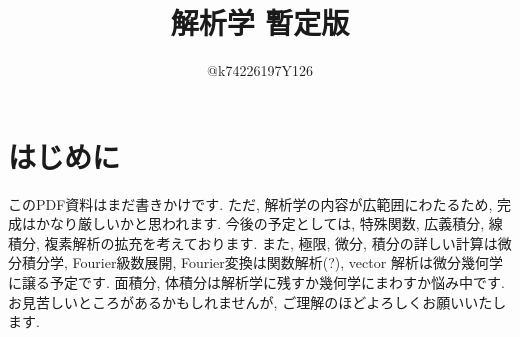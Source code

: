 \documentclass[10pt,a4paper,titlepage]{jsarticle}
\title{解析学 暫定版}
\author{@k74226197Y126}
\begin{document}
\maketitle
{}
\section*{はじめに}
\par
このPDF資料はまだ書きかけです. ただ, 解析学の内容が広範囲にわたるため, 完成はかなり厳しいかと思われます. 今後の予定としては, 特殊関数, 広義積分, 線積分, 複素解析の拡充を考えております. また, 極限, 微分, 積分の詳しい計算は微分積分学, Fourier級数展開, Fourier変換は関数解析(?), vector 解析は微分幾何学に譲る予定です. 面積分, 体積分は解析学に残すか幾何学にまわすか悩み中です. お見苦しいところがあるかもしれませんが, ご理解のほどよろしくお願いいたします. 
\tableofcontents
\clearpage
{}


\clearpage

\clearpage

\clearpage

\clearpage

\clearpage

\clearpage

\clearpage

\clearpage

\clearpage


\clearpage

\clearpage

\clearpage

\clearpage


\clearpage

\clearpage

\clearpage

\clearpage

\clearpage

\clearpage

\clearpage

\clearpage


\clearpage

\clearpage

\clearpage

\clearpage


\clearpage


\clearpage

\clearpage

\clearpage


\clearpage

\clearpage

\clearpage

\clearpage

\clearpage

\clearpage

\clearpage


\clearpage

\clearpage

\clearpage

\clearpage

\clearpage

%
%
%
\end{document}
